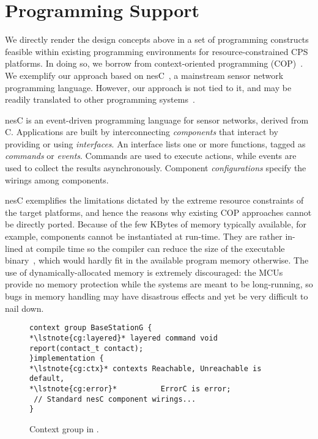 \section{Programming Support}
\label{sec:conesc}

We directly render the design concepts above in a set of programming
constructs feasible within existing programming environments for
resource-constrained CPS platforms. In doing so, we borrow from
context-oriented programming (COP)~\cite{}. We exemplify our approach
based on nesC~\cite{}, a mainstream sensor network programming
language. However, our approach is not tied to it, and may be readily
translated to other programming systems~\cite{programmingsurvey}.

 nesC is an event-driven programming language
for sensor networks, derived from C. Applications are built by
interconnecting \emph{components} that interact by providing or using
\emph{interfaces}. An interface lists one or more functions, tagged as
\emph{commands} or \emph{events}. Commands are used to execute
actions, while events are used to collect the results
asynchronously. %
Component \emph{configurations} specify the wirings among
components. %

nesC exemplifies the limitations dictated by the extreme resource
constraints of the target platforms, and hence the reasons why
existing COP approaches cannot be directly ported. Because of the few
KBytes of memory typically available, for example, components cannot
be instantiated at run-time. They are rather in-lined at compile time
so the compiler can reduce the size of the executable
binary~\cite{nesc}, which would hardly fit in the available program
memory otherwise. The use of dynamically-allocated memory is extremely
discouraged: the MCUs provide no memory protection while the systems
are meant to be long-running, so bugs in memory handling may have
disastrous effects and yet be very difficult to nail down.


\begin{figure}[!tb]
\begin{lstlisting}[style=conescframe]
context group BaseStationG {
*\lstnote{cg:layered}* layered command void report(contact_t contact);
}implementation {
*\lstnote{cg:ctx}* contexts Reachable, Unreachable is default,
*\lstnote{cg:error}*          ErrorC is error;
 // Standard nesC component wirings...
}
\end{lstlisting}
\vspace{-4mm}
\caption{Context group in \conesc.}
  \label{fig:configuration}
\vspace{-2mm}
\end{figure}

